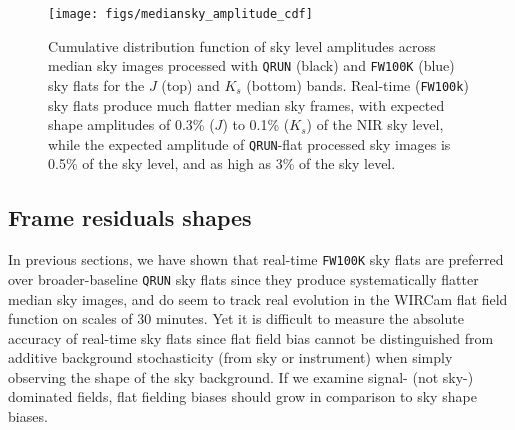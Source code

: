\documentclass[iop]{emulateapj}
\begin{document}
\begin{figure}[t]
\centering
\texttt{[image: figs/mediansky\_amplitude\_cdf]}
\caption{Cumulative distribution function of sky level amplitudes across median sky images processed with \texttt{QRUN} (black) and \texttt{FW100K} (blue) sky flats for the $J$ (top) and $K_s$ (bottom) bands. Real-time (\texttt{FW100k}) sky flats produce much flatter median sky frames, with expected shape amplitudes of 0.3\% ($J$) to 0.1\% ($K_s$) of the NIR sky level, while the expected amplitude of \texttt{QRUN}-flat processed sky images is 0.5\% of the sky level, and as high as 3\% of the sky level.
}
\label{fig:mediansky_amplitude}
\end{figure}

\subsection{Frame residuals shapes}
\label{sec:frameblockresiduals}

In previous sections, we have shown that real-time \texttt{FW100K} sky flats are preferred over broader-baseline \texttt{QRUN} sky flats since they produce systematically flatter median sky images, and do seem to track real evolution in the WIRCam flat field function on scales of 30 minutes.
Yet it is difficult to measure the absolute accuracy of real-time sky flats since flat field bias cannot be distinguished from additive background stochasticity (from sky or instrument) when simply observing the shape of the sky background.
If we examine signal- (not sky-) dominated fields, flat fielding biases should grow in comparison to sky shape biases.
\end{document}
